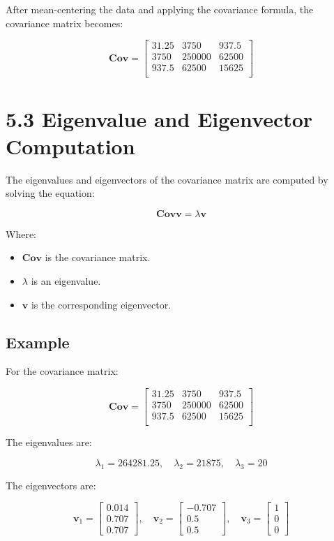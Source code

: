 \documentclass{article}
\begin{document}
After mean-centering the data and applying the covariance formula, the covariance matrix becomes:

\[
\mathbf{Cov} = 
\begin{bmatrix}
31.25 & 3750 & 937.5 \\
3750 & 250000 & 62500 \\
937.5 & 62500 & 15625 \\
\end{bmatrix}
\]

\section*{5.3 Eigenvalue and Eigenvector Computation}

The eigenvalues and eigenvectors of the covariance matrix are computed by solving the equation:

\[
\mathbf{Cov} \mathbf{v} = \lambda \mathbf{v}
\]

Where:
\begin{itemize}
    \item \(\mathbf{Cov}\) is the covariance matrix.
    \item \(\lambda\) is an eigenvalue.
    \item \(\mathbf{v}\) is the corresponding eigenvector.
\end{itemize}

\subsection*{Example}

For the covariance matrix:

\[
\mathbf{Cov} = 
\begin{bmatrix}
31.25 & 3750 & 937.5 \\
3750 & 250000 & 62500 \\
937.5 & 62500 & 15625 \\
\end{bmatrix}
\]

The eigenvalues are:

\[
\lambda_1 = 264281.25, \quad \lambda_2 = 21875, \quad \lambda_3 = 20
\]

The eigenvectors are:

\[
\mathbf{v}_1 = 
\begin{bmatrix}
0.014 \\
0.707 \\
0.707
\end{bmatrix}, \quad
\mathbf{v}_2 = 
\begin{bmatrix}
-0.707 \\
0.5 \\
0.5
\end{bmatrix}, \quad
\mathbf{v}_3 = 
\begin{bmatrix}
1 \\
0 \\
0
\end{bmatrix}
\]
\end{document}
